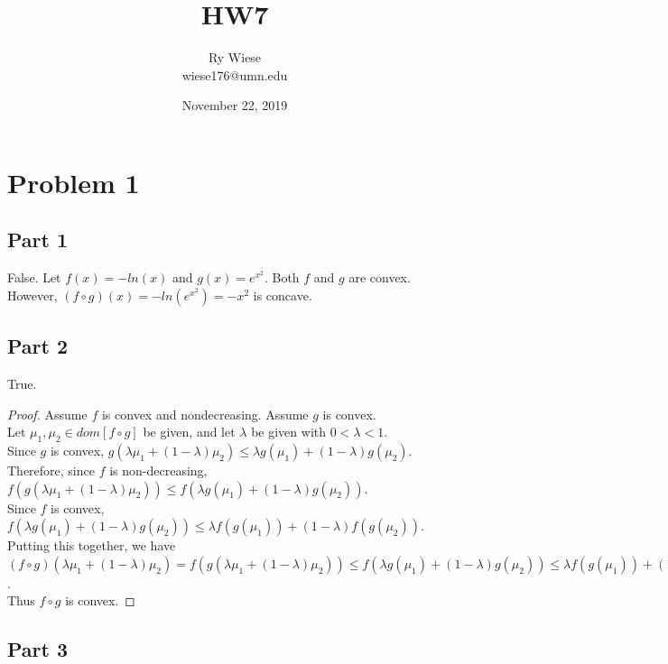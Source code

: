 \documentclass{article}
\title{HW7}
\author{Ry Wiese\\wiese176@umn.edu}
\date{November 22, 2019}
\begin{document}
\maketitle

\section{Problem 1}

\subsection{Part 1}

False. 
Let $f(x) = - ln(x)$ and $g(x) = e^{x^2}$. Both $f$ and $g$ are convex. However, $(f \circ g)(x) = -ln(e^{x^2}) = -x^2$ is concave. 

\subsection{Part 2}

True.

\begin{proof}

Assume $f$ is convex and nondecreasing. Assume $g$ is convex.\\
Let $\mu_1, \mu_2 \in dom[f \circ g]$ be given, and let $\lambda$ be given with $0 < \lambda < 1$.\\
Since $g$ is convex, $g(\lambda \mu_1 + (1 - \lambda) \mu_2) \le \lambda g(\mu_1) + (1 - \lambda) g(\mu_2).$\\
Therefore, since $f$ is non-decreasing,\\ $f(g(\lambda \mu_1 + (1 - \lambda) \mu_2)) \le f(\lambda g(\mu_1) + (1 - \lambda) g(\mu_2))$.\\
Since $f$ is convex, $f(\lambda g(\mu_1) + (1 - \lambda) g(\mu_2)) \le \lambda f(g(\mu_1)) + (1 - \lambda) f(g(\mu_2))$.\\
Putting this together, we have\\
$(f \circ g)(\lambda \mu_1 + (1 - \lambda) \mu_2) = f(g(\lambda \mu_1 + (1 - \lambda) \mu_2)) \le f(\lambda g(\mu_1) + (1 - \lambda) g(\mu_2)) \le \lambda f(g(\mu_1)) + (1 - \lambda) f(g(\mu_2)) = \lambda (f \circ g) (\mu_1) + (1 - \lambda) (f \circ g) (\mu_2)$.\\
Thus $f \circ g$ is convex.

\end{proof}

\subsection{Part 3}
\end{document}
